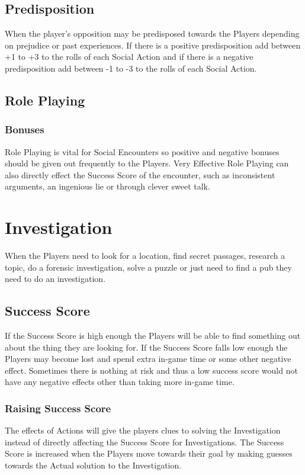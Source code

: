 \documentclass[a4paper,12pt,oneside]{book}
\begin{document}
            \subsection{Predisposition}
                When the player's opposition may be predisposed towards the Players depending on prejudice or past experiences. If there is a positive predisposition add between +1 to +3 to the rolls of each Social Action and if there is a negative predisposition add between -1 to -3 to the rolls of each Social Action.

            \subsection{Role Playing}
                \subsubsection{Bonuses}
                Role Playing is vital for Social Encounters so positive and negative bonuses should be given out frequently to the Players. Very Effective Role Playing can also directly effect the Success Score of the encounter, such as inconsistent arguments, an ingenious lie or through clever sweet talk.

        \section{Investigation}
            When the Players need to look for a location, find secret passages, research a topic, do a forensic investigation, solve a puzzle or just need to find a pub they need to do an investigation.

            \subsection{Success Score}
                If the Success Score is high enough the Players will be able to find something out about the thing they are looking for. If the Success Score falls low enough the Players may become lost and spend extra in-game time or some other negative effect. Sometimes there is nothing at risk and thus a low success score would not have any negative effects other than taking more in-game time.

            \subsubsection{Raising Success Score}
                The effects of Actions will give the players clues to solving the Investigation instead of directly affecting the Success Score for Investigations. The Success Score is increased when the Players move towards their goal by making guesses towards the Actual solution to the Investigation.
\end{document}
